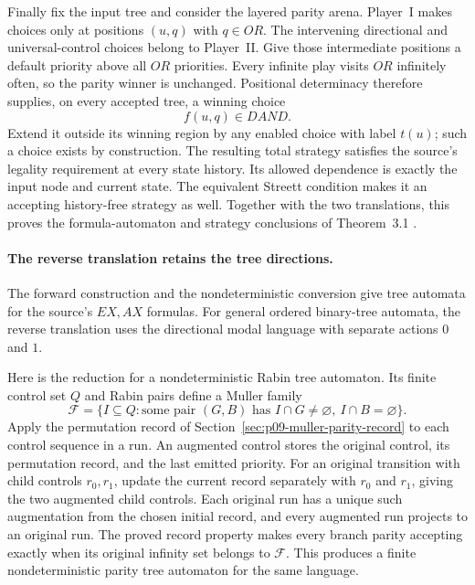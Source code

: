 Finally fix the input
tree and consider the
layered parity arena.
Player~I makes choices
only at positions
\((u,q)\) with \(q\in OR\).
The intervening directional
and universal-control choices
belong to Player~II.
Give those intermediate
positions a default priority
above all \(OR\) priorities.
Every infinite play visits
\(OR\) infinitely often,
so the parity winner
is unchanged.
Positional determinacy
therefore supplies, on
every accepted tree,
a winning choice
\[
 f(u,q)\in DAND.
\]
Extend it outside its
winning region by any
enabled choice with label
\(t(u)\); such a choice
exists by construction.
The resulting total
strategy satisfies the
source's legality requirement
at every state history.
Its allowed dependence
is exactly the input
node and current state.
The equivalent Streett
condition makes it an
accepting history-free
strategy as well.
Together with the two
translations, this proves
the formula-automaton and
strategy conclusions of
Theorem~3.1
\cite[\S3]{EmersonJutla1991}.

\paragraph{The reverse translation retains the tree directions.}
The forward construction and
the nondeterministic conversion
give tree automata for the
source's \(EX,AX\) formulas.
For general ordered binary-tree
automata, the reverse translation
uses the directional modal
language with separate actions
\(0\) and \(1\).

Here is the reduction for
a nondeterministic Rabin tree
automaton. Its finite control
set \(Q\) and Rabin pairs
define a Muller family
\[
 \mathcal F=
 \{I\subseteq Q:\text{some pair }(G,B)
               \text{ has }I\cap G\ne\varnothing,\ I\cap B=\varnothing\}.
\]
Apply the permutation record
of Section~\ref{sec:p09-muller-parity-record}
to each control sequence
in a run. An augmented
control stores the original
control, its permutation
record, and the last
emitted priority.
For an original transition
with child controls \(r_0,r_1\),
update the current record
separately with \(r_0\)
and \(r_1\), giving
the two augmented child
controls.
Each original run has a
unique such augmentation
from the chosen initial
record, and every augmented
run projects to an
original run.
The proved record property
makes every branch parity
accepting exactly when its
original infinity set
belongs to \(\mathcal F\).
This produces a finite
nondeterministic parity
tree automaton for the
same language.

